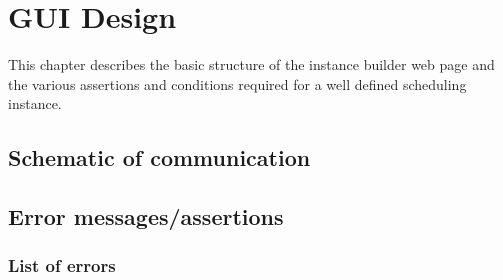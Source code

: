 \chapter{GUI Design}
\thispagestyle{plain}

This chapter describes the basic structure of the instance builder web page and the various assertions and conditions required for a well defined scheduling instance.

\section{Schematic of communication}

\section{Error messages/assertions} 

\subsection{List of errors}

